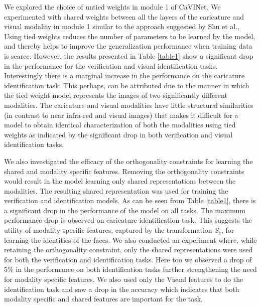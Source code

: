 We explored the choice of untied weights in module 1 of CaVINet. We experimented with shared weights between all the layers of the caricature and visual modality in module 1 similar to the approach suggested by  Shu et al., \cite{ACM_weak_shared} Using tied weights reduces the number of parameters to be learned by the model, and thereby helps to improve the generalization performance when training data is scarce. However, the results presented in Table \ref{table1} show a significant drop in the performance for the verification and visual identification tasks. Interestingly there is a marginal increase in the performance on the caricature identification task. This perhaps, can be attributed due to the manner in which the tied weight model represents the images of two significantly different modalities. The caricature and visual modalities have little structural similarities (in contrast to near infra-red and visual images) that makes it difficult for a model to obtain identical characterization of both the modalities using tied weights as indicated by the significant drop in both verification and visual identification tasks.



We also investigated the efficacy of the orthogonality constraints for learning the shared and modality specific features. Removing the orthogonality constraints would result in the model learning only shared representations between the modalities. The resulting shared representation was used for training the verification and identification models. As can be seen from Table \ref{table1}, there is a significant drop in the performance of the model on all tasks. The maximum performance drop is observed on caricature identification task. This suggests the utility of modality specific features, captured by the transformation $S_c$, for learning the identities of the faces. We also conducted an experiment where, while retaining the orthogonality constraint, only the shared representations were used for both the verification and identification tasks. Here too we observed a drop of 5\% in the performance on both identification tasks further strengthening the need for modality specific features. We also used only the Visual features to do the identification task and saw a drop in the accuracy which indicates that both modality specific and shared features are important for the task.



